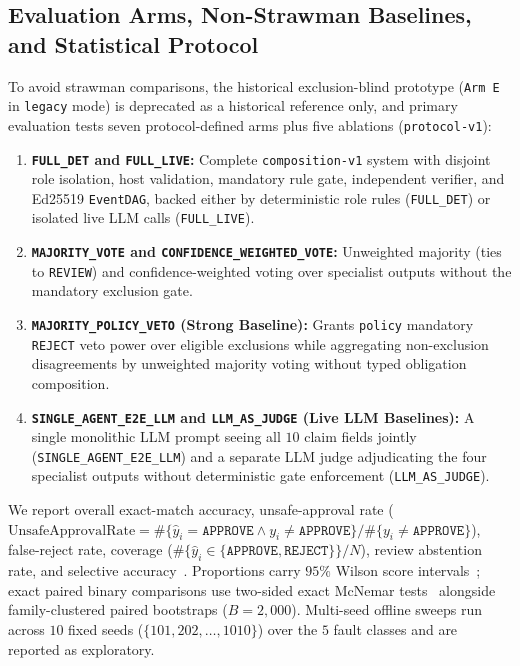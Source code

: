 \documentclass[11pt,a4paper]{article}
\begin{document}
\subsection{Evaluation Arms, Non-Strawman Baselines, and Statistical Protocol}
To avoid strawman comparisons, the historical exclusion-blind prototype (\texttt{Arm E} in \texttt{legacy} mode) is deprecated as a historical reference only, and primary evaluation tests seven protocol-defined arms plus five ablations (\texttt{protocol-v1}):
\begin{enumerate}[leftmargin=*,itemsep=2pt]
    \item \textbf{\texttt{FULL\_DET} and \texttt{FULL\_LIVE}:} Complete \texttt{composition-v1} system with disjoint role isolation, host validation, mandatory rule gate, independent verifier, and Ed25519 \texttt{EventDAG}, backed either by deterministic role rules (\texttt{FULL\_DET}) or isolated live LLM calls (\texttt{FULL\_LIVE}).
    \item \textbf{\texttt{MAJORITY\_VOTE} and \texttt{CONFIDENCE\_WEIGHTED\_VOTE}:} Unweighted majority (ties to \texttt{REVIEW}) and confidence-weighted voting over specialist outputs without the mandatory exclusion gate.
    \item \textbf{\texttt{MAJORITY\_POLICY\_VETO} (Strong Baseline):} Grants \texttt{policy} mandatory \texttt{REJECT} veto power over eligible exclusions while aggregating non-exclusion disagreements by unweighted majority voting without typed obligation composition.
    \item \textbf{\texttt{SINGLE\_AGENT\_E2E\_LLM} and \texttt{LLM\_AS\_JUDGE} (Live LLM Baselines):} A single monolithic LLM prompt seeing all $10$ claim fields jointly (\texttt{SINGLE\_AGENT\_E2E\_LLM}) and a separate LLM judge adjudicating the four specialist outputs without deterministic gate enforcement (\texttt{LLM\_AS\_JUDGE}).
\end{enumerate}

We report overall exact-match accuracy, unsafe-approval rate ($\text{UnsafeApprovalRate} = \#\{\hat{y}_i=\texttt{APPROVE} \land y_i\neq\texttt{APPROVE}\} / \#\{y_i\neq\texttt{APPROVE}\}$), false-reject rate, coverage ($\#\{\hat{y}_i\in\{\texttt{APPROVE},\texttt{REJECT}\}\}/N$), review abstention rate, and selective accuracy~\citep{geifman2017selective}. Proportions carry $95\%$ Wilson score intervals~\citep{wilson1927probable}; exact paired binary comparisons use two-sided exact McNemar tests~\citep{mcnemar1947note} alongside family-clustered paired bootstraps ($B=2{,}000$). Multi-seed offline sweeps run across $10$ fixed seeds ($\{101,202,\dots,1010\}$) over the $5$ fault classes and are reported as exploratory.
\end{document}

